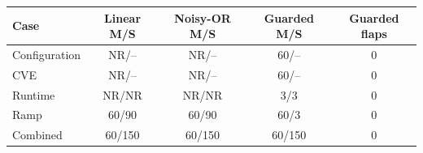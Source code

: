 \begin{tabular}{@{}lcccc@{}}
\toprule
\textbf{Case} & \textbf{Linear M/S} & \textbf{Noisy-OR M/S} & \textbf{Guarded M/S} & \textbf{Guarded flaps} \\
\midrule
Configuration & NR/-- & NR/-- & 60/-- & 0 \\
CVE & NR/-- & NR/-- & 60/-- & 0 \\
Runtime & NR/NR & NR/NR & 3/3 & 0 \\
Ramp & 60/90 & 60/90 & 60/3 & 0 \\
Combined & 60/150 & 60/150 & 60/150 & 0 \\
\bottomrule
\end{tabular}
